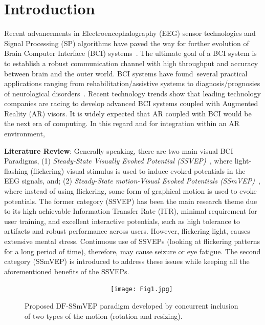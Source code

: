 \documentclass[sensors,accept,moreauthors,pdftex,10pt,a4paper]{mdpi}
\def\DFS{\text{DF-SSmVEP}} %
\theoremstyle{mdpi}
\newcounter{thm}
\newcounter{ex}
\newcounter{re}
\theoremstyle{mdpidefinition}
\begin{document}


\section{Introduction}
Recent advancements in Electroencephalography (EEG) sensor technologies and Signal Processing (SP) algorithms have paved the way for further evolution of Brain Computer Interface (BCI) systems~\cite{Jane:2019}. The ultimate goal of a BCI system is to establish a robust communication channel with high throughput and accuracy between brain and the outer world. BCI systems have found~several practical applications ranging from rehabilitation/assistive systems to diagnosis/prognosies of neurological disorders~\cite{Soroosh:2018, samanta, dagois}. Recent technology trends show that leading technology companies are racing to develop advanced  BCI systems coupled with Augmented Reality (AR) visors. It is widely expected that AR coupled with BCI would be the next era of computing. In this regard and for integration within an AR environment,

\vspace{.1in}
\noindent
\textbf{Literature Review}:
Generally speaking, there are two main visual BCI Paradigms, (1) \textit{Steady-State Visually Evoked Potential (SSVEP)~\cite{Kubacki:2021, Ikeda:2021, Guevara:2021, Chen:2021, zhang2019hierarchical, zhao2017ssvep,  nakanishi2014high, zhang2012multiple, wei2016stimulus, Kadioglu}}, where light-flashing (flickering) visual stimulus is used to induce evoked potentials in the EEG signals, and;
(2) \textit{Steady-State motion-Visual Evoked Potentials (SSmVEP)~\cite{Zhang:2021, yan2019steady, han2018highly, chai2019radial, beveridge2019neurogaming}}, where instead of using flickering, some form of graphical motion is used to evoke potentials.
%
The former category (SSVEP) has been the main research theme due to its high achievable Information Transfer Rate (ITR), minimal requirement for user training, and excellent interactive potentials, such as high tolerance to artifacts and robust performance across users. However, flickering light, causes extensive mental stress. Continuous use of SSVEPs (looking at flickering patterns for a long period of time), therefore, may cause seizure or eye fatigue.
%
The second category (SSmVEP) is introduced to address these issues while keeping all the aforementioned benefits of the SSVEPs.
\begin{figure}[t!]
~~~~~~~~~~~~~~~~~~~~~~~~\texttt{[image: Fig1.jpg]}
\caption{\footnotesize Proposed $\DFS$ paradigm  developed by concurrent inclusion of two types of the motion (rotation and resizing).}
\label{Fig:DF-SSmVEP}
\end{figure}
\end{document}
